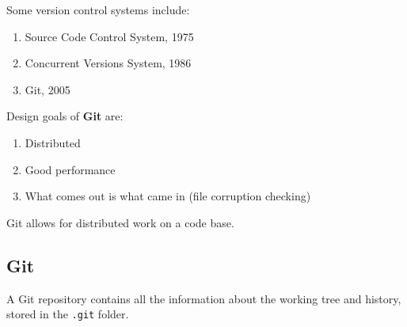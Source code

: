 Some version control systems include:

\begin{enumerate}
	\item Source Code Control System, 1975
	\item Concurrent Versions System, 1986
	\item Git, 2005
\end{enumerate}

Design goals of \textbf{Git} are:

\begin{enumerate}
	\item Distributed
	\item Good performance 
	\item What comes out is what came in (file corruption checking)
\end{enumerate}

Git allows for distributed work on a code base.

\subsection{Git}

A Git repository contains all the information about the working tree and history, stored in the \texttt{.git} folder.

